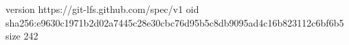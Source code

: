 version https://git-lfs.github.com/spec/v1
oid sha256:e9630c1971b2d02a7445c28e30cbc76d95b5c8db9095ad4c16b823112c6bf6b5
size 242

